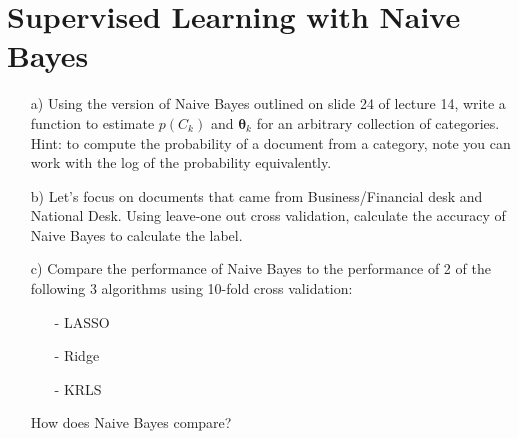 \documentclass[12pt,letterpaper]{article}
\begin{document}
\section{Supervised Learning with Naive Bayes}

\begin{itemize}
\item[a)] Using the version of Naive Bayes outlined on slide 24 of lecture 14, write a function to estimate $p(C_{k})$ and $\boldsymbol{\theta}_{k}$ for an arbitrary collection of categories.  Hint: to compute the probability of a document from a category, note you can work with the log of the probability equivalently.  
\item[b)] Let's focus on documents that came from Business/Financial desk and National Desk.  Using leave-one out cross validation, calculate the accuracy of Naive Bayes to calculate the label.
\item[c)] Compare the performance of Naive Bayes to the performance of 2 of the following 3 algorithms using 10-fold cross validation:
\begin{itemize}
\item[-] LASSO 
\item[-] Ridge 
\item[-] KRLS 
\end{itemize}
How does Naive Bayes compare? 
\end{itemize}

  
\end{document}
